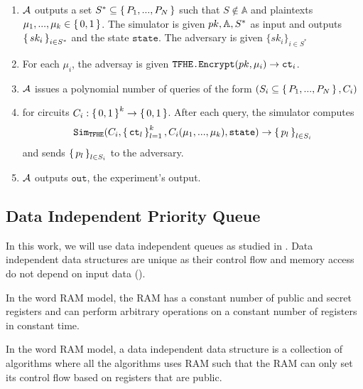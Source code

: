 \begin{definition}
\begin{itemize}
\begin{enumerate}
						\item $\mathcal{A}$ outputs a set $S^* \subseteq \set{P_1, ..., P_N}$ such that $S \notin \mathbb{A}$
						and plaintexts $\mu_1, ..., \mu_k \in \set{0, 1}$. The simulator is given $pk, \mathbb{A}, S^*$ as input
						and outputs $\set{sk_i}_{i \in S^*}$ and the state $\texttt{state}$. The adversary is given $\{sk_i\}_{i \in S^*}$
						\item For each $\mu_i$, the adversay is given $\texttt{TFHE.Encrypt}(pk, \mu_i) \rightarrow \texttt{ct}_i$.
						\item $\mathcal{A}$ issues a polynomial number of queries of the form $(S_i \subseteq \set{P_1, ..., P_N}, C_i)$
						\item for circuits $C_i: \set{0, 1}^k \rightarrow \set{0, 1}$. After each query, the simulator computes
						$$
							\texttt{Sim}_{{\texttt{TFHE}}}(C_i, \set{\texttt{ct}_l}_{l=1}^k, C_i(\mu_1, ..., \mu_k), \texttt{state}) \rightarrow \set{p_l}_{l \in S_i}
						$$
						and sends $\set{p_l}_{l \in S_i}$ to the adversary.
						\item $\mathcal{A}$ outputs $\texttt{out}$, the experiment's output.

		      \end{enumerate}
	\end{itemize}

\end{definition}

\subsection{Data Independent Priority Queue}
In this work, we will use data independent queues as studied in \cite{toft2011secure, mitchell2014data, mazloom2023efficient}.
Data independent data structures are unique as their control flow and memory access do not depend on input data (\cite{mitchell2014data}).

\begin{definition}
	In the word RAM model, the RAM has a constant number of public and secret registers and can perform arbitrary operations on a constant number of registers in constant time.
\end{definition}

\begin{definition}
	In the word RAM model, a data independent data structure is a collection of algorithms where
	all the algorithms uses RAM such that the RAM can only set its	control flow based on registers that are public.
\end{definition}

